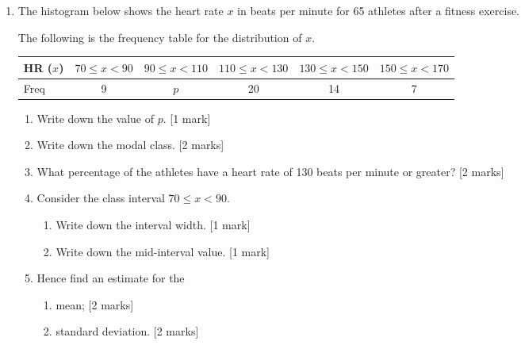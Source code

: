 \documentclass[12pt, twoside]{article}
\begin{document}
\begin{enumerate}
\newpage
\item The histogram below shows the heart rate $x$ in beats per minute for 65 athletes after a fitness exercise.
  \begin{center}
  \end{center}
  The following is the frequency table for the distribution of $x$. \\[0.25cm]
    \begin{tabular}{|l|c|c|c|c|c|}
      \hline
      HR ($x$) & $70 \leq x < 90$ & $90 \leq x < 110$ & $110 \leq x < 130$ & $130 \leq x < 150$ & $150 \leq x < 170$ \\ 
      \hline 
      Freq & 9 & $p$ & 20 & 14 & 7  \\ 
      \hline 
      \end{tabular}
  \begin{enumerate}
    \item Write down the value of $p$. \hfill [1 mark] \vspace{1cm}
    \item Write down the modal class. \hfill [2 marks] \vspace{1cm}
    \item What percentage of the athletes have a heart rate of 130 beats per minute or greater? \hfill [2 marks] \vspace{1cm}
    \item Consider the class interval $70 \leq x < 90$.
    \begin{enumerate}
      \item Write down the interval width. \hfill [1 mark] \vspace{1cm}
      \item Write down the mid-interval value. \hfill [1 mark] 
    \end{enumerate}
    \item Hence find an estimate for the
    \begin{enumerate}
      \item mean; \hfill [2 marks] \vspace{1cm}
      \item standard deviation. \hfill [2 marks] 
    \end{enumerate}
  \end{enumerate}


\end{enumerate}
\end{document}
